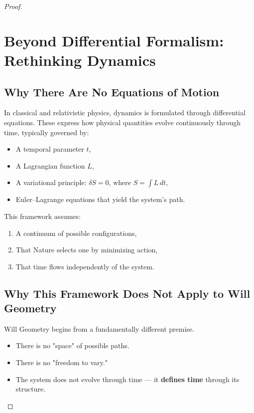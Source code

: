 \documentclass{article}
\begin{document}
\begin{proof}
\section{Beyond Differential Formalism: Rethinking Dynamics}

\subsection*{Why There Are No Equations of Motion}

In classical and relativistic physics, dynamics is formulated through differential equations.  
These express how physical quantities evolve continuously through time, typically governed by:

\begin{itemize}
    \item A temporal parameter $t$,
    \item A Lagrangian function $L$,
    \item A variational principle: $\delta S = 0$, where $S = \int L\,dt$,
    \item Euler–Lagrange equations that yield the system’s path.
\end{itemize}

This framework assumes:

\begin{enumerate}
    \item A continuum of possible configurations,
    \item That Nature selects one by minimizing action,
    \item That time flows independently of the system.
\end{enumerate}

\subsection*{Why This Framework Does Not Apply to Will Geometry}

Will Geometry begins from a fundamentally different premise.

\begin{itemize}
    \item There is no "space" of possible paths.
    \item There is no "freedom to vary."
    \item The system does not evolve through time --- it \textbf{defines time} through its structure.
\end{itemize}


\end{proof}
\end{document}
